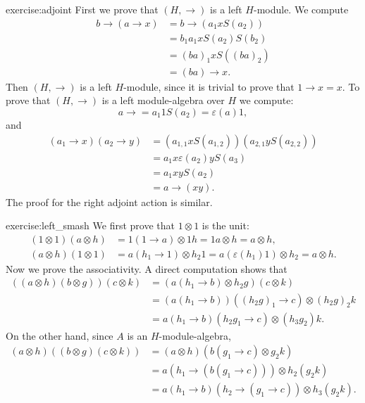 \begin{sol}{exercise:adjoint}
First we prove that $(H,\rightarrow)$ is a left $H$-module.  We
compute 
\begin{align*} 
b\rightarrow(a\rightarrow x) & =b\rightarrow(a_{1}xS(a_{2}))\\
 & =b_{1}a_{1}xS(a_{2})S(b_{2})\\
 & =(ba)_{1}xS\left((ba)_{2}\right)\\
 & =(ba)\rightarrow x.
\end{align*}
Then $(H,\rightarrow)$ is a left $H$-module, since it is trivial
to prove that $1\rightarrow x=x$. To prove that $(H,\rightarrow)$
is a left module-algebra over $H$ we compute:
\[
a\rightarrow=a_{1}1S(a_{2})=\varepsilon(a)1,
\]
and
\begin{align*}
(a_{1}\rightarrow x)(a_{2}\rightarrow y) & =(a_{1,1}xS(a_{1,2}))(a_{2,1}yS(a_{2,2}))\\
 & =a_{1}x\varepsilon(a_{2})yS(a_{3})\\
 & =a_{1}xyS(a_{2})\\
 & =a\rightarrow(xy).
\end{align*}
The proof for the right adjoint action is similar. 
\end{sol}

\begin{sol}{exercise:left_smash}
We first prove that $1\otimes1$ is the unit: 
\begin{align*}
(1\otimes1)(a\otimes h) & =1(1\rightarrow a)\otimes1h=1a\otimes h=a\otimes h,\\
(a\otimes h)(1\otimes1) & =a(h_{1}\rightarrow1)\otimes h_{2}1=a(\varepsilon(h_{1})1)\otimes h_{2}=a\otimes h.
\end{align*}
Now we prove the associativity. A direct computation shows that 
\begin{align*}
\left((a\otimes h)(b\otimes g)\right)(c\otimes k) & =(a(h_{1}\rightarrow b)\otimes h_{2}g)(c\otimes k)\\
 & =(a(h_{1}\rightarrow b))((h_{2}g)_{1}\rightarrow c)\otimes(h_{2}g)_{2}k\\
 & =a(h_{1}\rightarrow b)(h_{2}g_{1}\rightarrow c)\otimes(h_{3}g_{2})k.
\end{align*}
On the other hand, since $A$ is an $H$-module-algebra,
\begin{align*}
(a\otimes h)\left((b\otimes g)(c\otimes k)\right) & =(a\otimes h)(b(g_{1}\rightarrow c)\otimes g_{2}k)\\
 & =a(h_{1}\rightarrow(b(g_{1}\rightarrow c)))\otimes h_{2}(g_{2}k)\\
 & =a(h_{1}\rightarrow b)(h_{2}\rightarrow(g_{1}\rightarrow c))\otimes h_{3}(g_{2}k).
\end{align*}
\end{sol}


